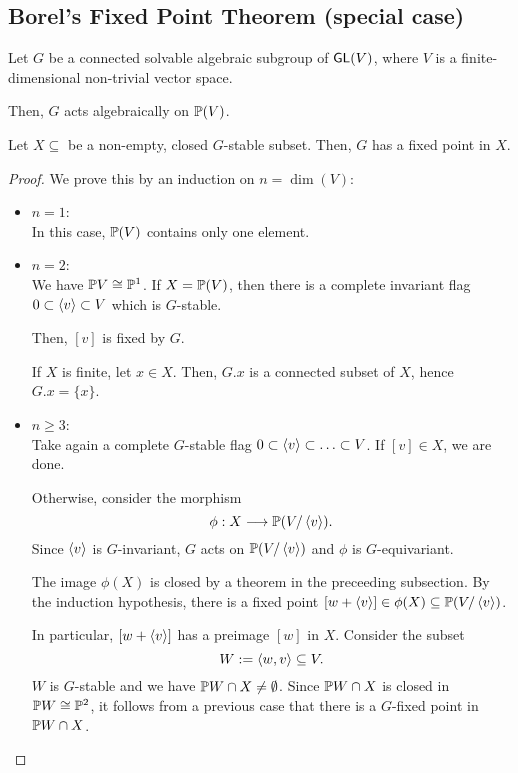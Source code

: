 \subsection{Borel's Fixed Point Theorem (special case)}

\begin{theorem}
	Let $G$ be a connected solvable algebraic subgroup of $\GL(V)$, where $V$ is a finite-dimensional non-trivial vector space.
	
	Then, $G$ acts algebraically on $\P(V)$.
	
	Let $X \subseteq$ be a non-empty, closed $G$-stable subset. Then, $G$ has a fixed point in $X$.
\end{theorem}

\begin{proof}
	We prove this by an induction on $n = \dim(V)$:
	\begin{itemize}
		\item $n = 1$:\\
		In this case, $\P(V)$ contains only one element.
		\item $n = 2$:\\
		We have $\P V \isom{} \P^1$. If $X = \P(V)$, then there is a complete invariant flag $0 \subset \shrp{v} \subset V$ which is $G$-stable.
		
		Then, $[v]$ is fixed by $G$.
		
		If $X$ is finite, let $x \in X$. Then, $G.x$ is a connected subset of $X$, hence $G.x = \{x\}$.
		\item $n \geq 3$:\\
		Take again a complete $G$-stable flag $0 \subset \shrp{v} \subset \ldots \subset V$. If $[v] \in X$, we are done.
		
		Otherwise, consider the morphism
		\[ \phi : X \Pfeil{} \P(V / \shrp{v}). \]
		Since $\shrp{v}$ is $G$-invariant, $G$ acts on $\P(V / \shrp{v})$ and $\phi$ is $G$-equivariant.
		
		The image $\phi(X)$ is closed by a theorem in the preceeding subsection. By the induction hypothesis, there is a fixed point $[w + \shrp{v}] \in \phi(X) \subseteq \P(V / \shrp{v})$.
		
		In particular, $[w+\shrp{v}]$ has a preimage $[w]$ in $X$. Consider the subset
		\[ W := \shrp{w,v} \subseteq V. \]
		$W$ is $G$-stable and we have $\P W \cap X\neq \emptyset$. Since $\P W \cap X$ is closed in $\P W \isom{} \P^2$, it follows from a previous case that there is a $G$-fixed point in $\P W \cap X$.
	\end{itemize}
\end{proof}
